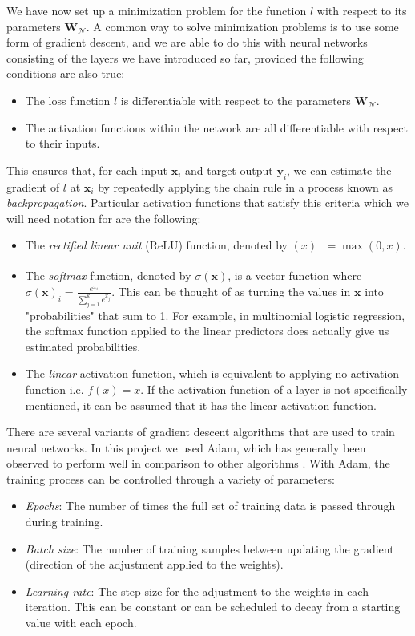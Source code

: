 \documentclass{somasmsc}
\begin{document}
We have now set up a minimization problem for the function $l$ with respect to its parameters $\mathbf{W}_{\mathcal{N}}$. A common way to solve minimization problems is to use some form of gradient descent, and we are able to do this with neural networks consisting of the layers we have introduced so far, provided the following conditions are also true:
\begin{itemize}
    \item The loss function $l$ is differentiable with respect to the parameters $\mathbf{W}_{\mathcal{N}}$.
    \item The activation functions within the network are all differentiable with respect to their inputs.
\end{itemize}
This ensures that, for each input $\pmb{x}_i$ and target output $\pmb{y}_i$, we can estimate the gradient of $l$ at $\pmb{x}_i$ by repeatedly applying the chain rule in a process known as \textit{backpropagation}. Particular activation functions that satisfy this criteria which we will need notation for are the following:
\begin{itemize}
    \item The \textit{rectified linear unit} (ReLU) function, denoted by $\left(x\right)_+ = \max{\left(0, x\right)}$.
    \item The \textit{softmax} function, denoted by $\sigma\left(\pmb{x}\right)$, is a vector function where $\sigma\left(\pmb{x}\right)_i = \frac{e^{x_i}}{\sum_{j=1}^k e^{x_j}}$. This can be thought of as turning the values in $\pmb{x}$ into "probabilities" that sum to 1. For example, in multinomial logistic regression, the softmax function applied to the linear predictors does actually give us estimated probabilities.
    \item The \textit{linear} activation function, which is equivalent to applying no activation function i.e. $f(x) = x$. If the activation function of a layer is not specifically mentioned, it can be assumed that it has the linear activation function.
\end{itemize}

There are several variants of gradient descent algorithms that are used to train neural networks. In this project we used Adam, which has generally been observed to perform well in comparison to other algorithms \citep{kingma2014adam}. With Adam, the training process can be controlled through a variety of parameters:
\begin{itemize}
    \item \textit{Epochs}: The number of times the full set of training data is passed through during training.
    \item \textit{Batch size}: The number of training samples between updating the gradient (direction of the adjustment applied to the weights).
    \item \textit{Learning rate}: The step size for the adjustment to the weights in each iteration. This can be constant or can be scheduled to decay from a starting value with each epoch.
\end{itemize}
\end{document}
